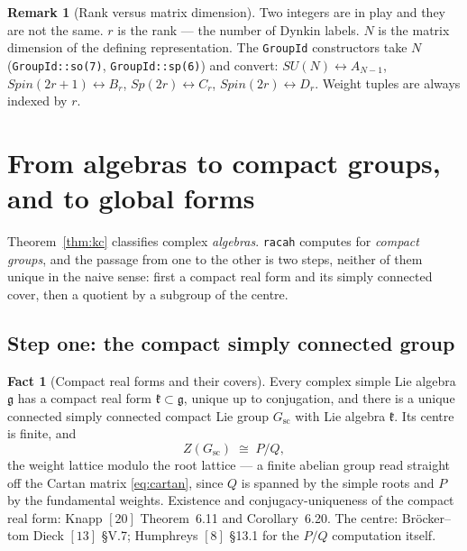 \documentclass[11pt,a4paper]{article}
\theoremstyle{plain}
\theoremstyle{definition}
\newtheorem{fact}[theorem]{Fact}
\newtheorem{remark}[theorem]{Remark}
\newcommand{\g}{\mathfrak{g}}
\newcommand{\code}[1]{\texttt{#1}}
\begin{document}
\begin{remark}[Rank versus matrix dimension]
Two integers are in play and they are not the same. $r$ is the rank --- the
number of Dynkin labels. $N$ is the matrix dimension of the defining
representation. The \code{GroupId} constructors take $N$
(\code{GroupId::so(7)}, \code{GroupId::sp(6)}) and convert:
$SU(N)\leftrightarrow A_{N-1}$, $Spin(2r+1)\leftrightarrow B_r$,
$Sp(2r)\leftrightarrow C_r$, $Spin(2r)\leftrightarrow D_r$. Weight tuples are
always indexed by $r$.
\end{remark}

\section{From algebras to compact groups, and to global forms}
\label{sec:global}

Theorem~\ref{thm:kc} classifies complex \emph{algebras}. \code{racah} computes
for \emph{compact groups}, and the passage from one to the other is two steps,
neither of them unique in the naive sense: first a compact real form and its
simply connected cover, then a quotient by a subgroup of the centre.

\subsection{Step one: the compact simply connected group}
\label{sec:compactforms}

\begin{fact}[Compact real forms and their covers]\label{fact:compactform}
Every complex simple Lie algebra $\g$ has a compact real form
$\mathfrak{k}\subset\g$, unique up to conjugation, and there is a unique
connected simply connected compact Lie group $G_{\mathrm{sc}}$ with Lie algebra
$\mathfrak{k}$. Its centre is finite, and
\begin{equation}\label{eq:centre}
  Z(G_{\mathrm{sc}}) \;\cong\; P/Q ,
\end{equation}
the weight lattice modulo the root lattice --- a finite abelian group read
straight off the Cartan matrix \eqref{eq:cartan}, since $Q$ is spanned by the
simple roots and $P$ by the fundamental weights. Existence and
conjugacy-uniqueness of the compact real form: Knapp $[20]$ Theorem~6.11 and
Corollary~6.20. The centre: Br\"ocker--tom Dieck $[13]$ \S V.7;
Humphreys $[8]$ \S13.1 for the $P/Q$ computation itself.
\end{fact}
\end{document}
